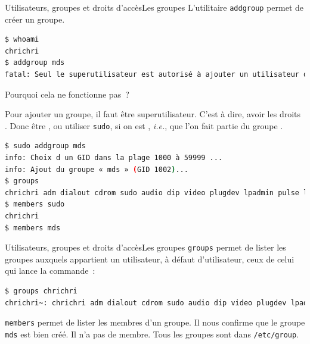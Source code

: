 \documentclass{beamer}
\begin{document}
    \begin{frame}[fragile]{Utilisateurs, groupes et droits d'accès}{Les groupes}
        L'utilitaire \lstinline{addgroup} permet de créer un groupe.
        \begin{lstlisting}[language=bash,basicstyle=\tiny\ttfamily]
$ whoami
chrichri
$ addgroup mds
fatal: Seul le superutilisateur est autorisé à ajouter un utilisateur ou un groupe au système.
        \end{lstlisting}
        Pourquoi cela ne fonctionne pas~?
        \pause
        \begin{dangercolorbox}
            Pour ajouter un groupe, il faut être superutilisateur.
            C'est à dire, avoir les droits .
            Donc être , ou utiliser \lstinline{sudo}, si on est , \textit{i.e.}, que l'on fait partie du groupe .
        \end{dangercolorbox}
        \begin{lstlisting}[language=bash,basicstyle=\tiny\ttfamily]
$ sudo addgroup mds
info: Choix d un GID dans la plage 1000 à 59999 ...
info: Ajout du groupe « mds » (GID 1002)...
$ groups
chrichri adm dialout cdrom sudo audio dip video plugdev lpadmin pulse lxd sambashare docker libvirt nordvpn
$ members sudo
chrichri
$ members mds
        \end{lstlisting}
    \end{frame}

    \begin{frame}[fragile]{Utilisateurs, groupes et droits d'accès}{Les groupes}
        \lstinline{groups} permet de lister les groupes auxquels appartient un utilisateur, à défaut d'utilisateur, ceux de celui qui lance la commande~:
        \begin{lstlisting}[language=bash]
$ groups chrichri
chrichri~: chrichri adm dialout cdrom sudo audio dip video plugdev lpadmin pulse lxd sambashare nordvpn docker libvirt
        \end{lstlisting}
        \lstinline{members} permet de lister les membres d'un groupe.
        Il nous confirme que le groupe \lstinline{mds} est bien créé.
        Il n'a pas de membre.
        \bigbreak
        Tous les groupes sont dans \lstinline{/etc/group}.
    \end{frame}
\end{document}
